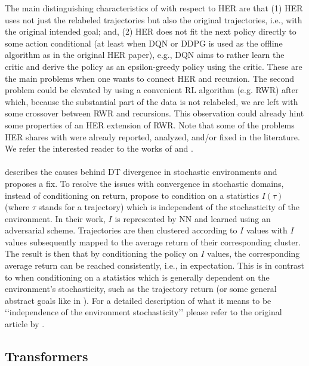 The main distinguishing characteristics of  \eUDRL{} with respect to HER are that
(1) HER uses not just the relabeled trajectories but also the original trajectories, i.e., with the original intended goal;
and, (2) HER does not fit the next policy directly to some action conditional (at least when DQN or DDPG is used as the offline algorithm as in the original HER paper), e.g., DQN aims to rather learn the critic and derive the policy as an epsilon-greedy
policy using the critic.
These are the main problems when one wants to connect HER and \eUDRL{} recursion.
The second problem could be elevated by using a convenient RL algorithm (e.g. RWR) after which, because the substantial part of the data is not relabeled, we are left with some crossover between RWR and \eUDRL{} recursions.
This observation could already hint some properties of an  HER extension of RWR.
Note that some of the problems HER shares with \eUDRL{} were already reported, analyzed, and/or fixed in the literature. We refer the interested reader to the works of \citet{lanka2018archer} and \citet{schramm2023usher}.

\paragraph{\citet{paster2022cant}} describes the causes behind DT divergence in stochastic environments and proposes a fix.
To resolve the issues with convergence in stochastic domains, instead of conditioning on return, \citet{paster2022cant} propose to condition on a statistics
$I(\tau)$ (where $\tau$ stands for a trajectory) which is independent of the stochasticity of the environment. In their work, $I$ is represented by NN and learned using an adversarial scheme. Trajectories are then clustered according to $I$ values with $I$ values subsequently mapped to the average return of their corresponding cluster.
The result is then that by conditioning the policy on $I$ values, the corresponding 
average return can be reached consistently, i.e., in expectation.
This is in contrast to when conditioning on a statistics which is generally dependent on the environment's stochasticity, such as the trajectory return (or some general abstract goals like in \eUDRL{}).
For a detailed description of what it means to be \lq\lq{}independence of the environment stochasticity\rq\rq{}
please refer to the original article by \citet{paster2022cant}.

\subsection{Transformers}
\label{sec:rw:transformers}


